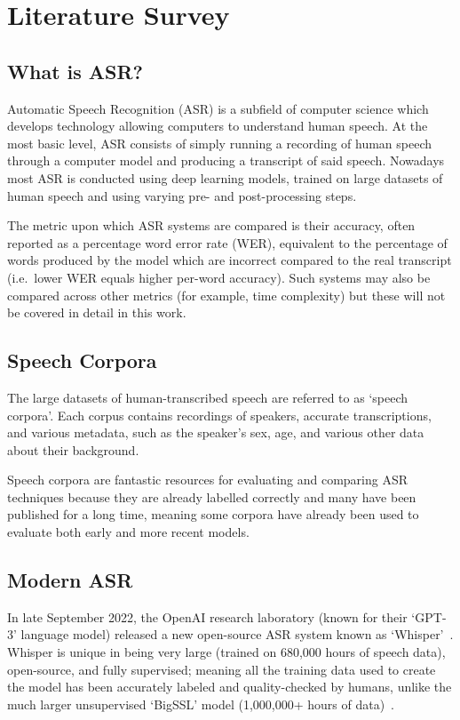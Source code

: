 \chapter{Literature Survey}\label{ch:literature-survey}

\section{What is ASR?}\label{sec:what-is-asr?}

Automatic Speech Recognition (ASR) is a subfield of computer science which develops technology
allowing computers to understand human speech.
At the most basic level, ASR consists of simply running a recording of human speech through a
computer model and producing a transcript of said speech.
Nowadays most ASR is conducted using deep learning models, trained on large datasets of human
speech and using varying pre- and post-processing steps.

The metric upon which ASR systems are compared is their accuracy, often reported as a percentage
word error rate (WER), equivalent to the percentage of words produced by the model which are
incorrect compared to the real transcript (i.e.\ lower WER equals higher per-word accuracy).
Such systems may also be compared across other metrics (for example, time complexity) but these
will not be covered in detail in this work.

\section{Speech Corpora}\label{sec:speech-corpora}

The large datasets of human-transcribed speech are referred to as `speech corpora'.
Each corpus contains recordings of speakers, accurate transcriptions, and various metadata, such as
the speaker's sex, age, and various other data about their background.

Speech corpora are fantastic resources for evaluating and comparing ASR techniques because they
are already labelled correctly and many have been published for a long time, meaning some corpora
have already been used to evaluate both early and more recent models.

\section{Modern ASR}\label{sec:modern-asr}

In late September 2022, the OpenAI research laboratory (known for their `GPT-3' language model)
released a new open-source ASR system known as `Whisper'~\cite{whisper}.
Whisper is unique in being very large (trained on 680,000 hours of speech data), open-source, and
fully supervised;
meaning all the training data used to create the model has been accurately labeled and
quality-checked by humans, unlike the much larger unsupervised `BigSSL' model (1,000,000+ hours
of data)~\cite{bigssl}.

